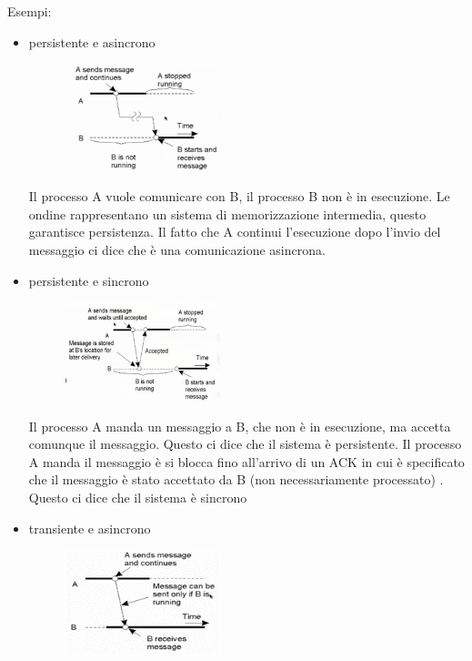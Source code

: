 \documentclass[12pt,italian]{report}
\begin{document}
\noindent Esempi:
\begin{itemize}
    \item persistente e asincrono
    \begin{figure}[h]
    \centering
    \includegraphics[width=45mm]{img/comm1.png}
    \end{figure}
    \bigbreak
    Il processo A vuole comunicare con B, il processo B non è in esecuzione. Le ondine rappresentano un sistema di memorizzazione intermedia, questo garantisce persistenza. Il fatto che A continui l'esecuzione dopo l'invio del messaggio ci dice che è una comunicazione asincrona. 
    
    \item persistente e sincrono
    \begin{figure}[h]
    \centering
    \includegraphics[width=45mm]{img/comm2.png}
    \end{figure}
    
    Il processo A manda un messaggio a B, che non è in esecuzione, ma accetta comunque il messaggio. Questo ci dice che il sistema è persistente. Il processo A manda il messaggio è si blocca fino all'arrivo di un ACK in cui è specificato che il messaggio è stato accettato da B (non necessariamente processato) . Questo ci dice che il sistema è sincrono
    
    \item transiente e asincrono
     \begin{figure}[h]
    \centering
    \includegraphics[width=45mm]{img/comm3.png}
    \end{figure}


\end{itemize}
\end{document}
